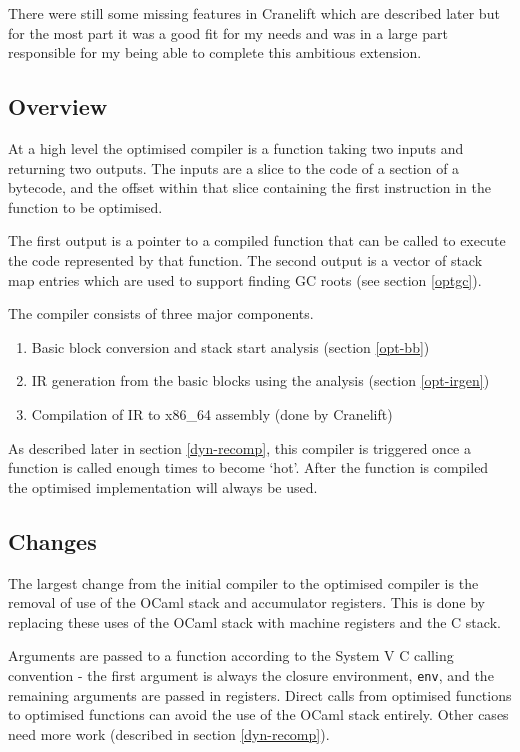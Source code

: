 There were still some missing features in Cranelift which are described later but for the most
part it was a good fit for my needs and was in a large part responsible for my being able to
complete this ambitious extension.

\subsection{Overview}

At a high level the optimised compiler is a function taking two inputs and returning two outputs.
The inputs are a slice to the code of a section of a bytecode, and the offset within that slice
containing the
first instruction in the function to be optimised.

The first output is a pointer to a compiled function that can be called to execute the code
represented by that function. The second output is a vector of stack map entries which are used
to support finding GC roots (see section \ref{optgc}).

The compiler consists of three major components.

\begin{enumerate}
      \item Basic block conversion and stack start analysis (section \ref{opt-bb})
      \item IR generation from the basic blocks using the analysis (section \ref{opt-irgen})
      \item Compilation of IR to x86\_64 assembly (done by Cranelift)
\end{enumerate}

As described later in section \ref{dyn-recomp}, this compiler is triggered once a function is
called enough times to become `hot'. After the function is compiled the optimised implementation
will always be used.

\subsection{Changes}

The largest change from the initial compiler to the optimised compiler is the removal of
use of the OCaml stack and accumulator registers. This is done by replacing these uses of the OCaml
stack with machine registers and the C stack.

Arguments are passed to a function according to the System V C calling convention - the first
argument is always the closure environment, \texttt{env}, and the remaining arguments are passed
in registers. Direct calls from optimised functions to optimised functions can avoid the use of
the OCaml stack entirely. Other cases need more work (described in section \ref{dyn-recomp}).

